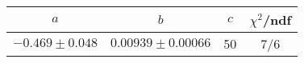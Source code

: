 \begin{tabular}{c|c|c|c}
$a$ & $b$ & $c$ & $\chi^2$/ndf \\
\hline
$-0.469\pm0.048$ & $0.00939\pm0.00066$ & 50 & 7/6
\end{tabular}
